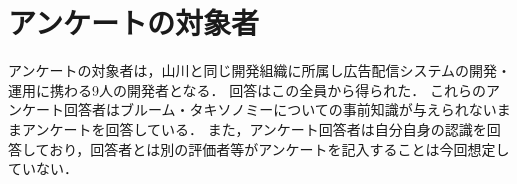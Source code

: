 \section{アンケートの対象者}
アンケートの対象者は，山川と同じ開発組織に所属し広告配信システムの開発・運用に携わる9人の開発者となる．
回答はこの全員から得られた．
これらのアンケート回答者はブルーム・タキソノミーについての事前知識が与えられないままアンケートを回答している．
また，アンケート回答者は自分自身の認識を回答しており，回答者とは別の評価者等がアンケートを記入することは今回想定していない．
